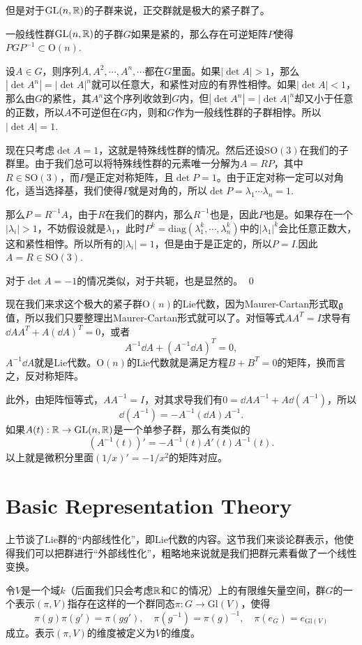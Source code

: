 但是对于$\mathrm{GL}(n,\mathbb{R})$的子群来说，正交群就是极大的紧子群了。

\pro 一般线性群$\mathrm{GL}(n,\mathbb{R})$的子群$G$如果是紧的，那么存在可逆矩阵$P$使得$PGP^{-1}\subset \mathrm{O}(n)$.

\proof 设$A\in G$，则序列$A,A^2,\cdots,A^n,\cdots$都在$G$里面。如果$|\det A|>1$，那么$|\det A^n|=|\det A|^n$就可以任意大，和紧性对应的有界性相悖。如果$|\det A|<1$，那么由$G$的紧性，其$A^n$这个序列收敛到$G$内，但$|\det A^n|=|\det A|^n$却又小于任意的正数，所以$A$不可逆但在$G$内，则和$G$作为一般线性群的子群相悖。所以$|\det A|=1$.

现在只考虑$\det A=1$，这就是特殊线性群的情况。然后还设$\mathrm{SO}(3)$在我们的子群里。由于我们总可以将特殊线性群的元素唯一分解为$A=RP$，其中$R\in \mathrm{SO}(3)$，而$P$是正定对称矩阵，且$\det P=1$。由于正定对称一定可以对角化，适当选择基，我们使得$P$就是对角的，所以$\det P=\lambda_1\cdots\lambda_n=1$.

那么$P=R^{-1}A$，由于$R$在我们的群内，那么$R^{-1}$也是，因此$P$也是。如果存在一个$|\lambda_i|>1$，不妨假设就是$\lambda_1$，此时$P^{k}=\mathrm{diag}(\lambda_1^k,\cdots,\lambda_n^k)$中的$|\lambda_1|^k$会比任意正数大，这和紧性相悖。所以所有的$|\lambda_i|=1$，但是由于是正定的，所以$P=I$.因此$A=R\in\mathrm{SO}(3)$.

对于$\det A=-1$的情况类似，对于共轭，也是显然的。 \qed

现在我们来求这个极大的紧子群$\mathrm{O}(n)$的Lie代数，因为Maurer-Cartan形式取${\mathfrak{g}}$值，所以我们只要整理出Maurer-Cartan形式就可以了。对恒等式$AA^T=I$求导有$\dd A A^T+A(\dd A)^T=0$，或者
\[
	A^{-1}\dd A+(A^{-1}\dd A)^T=0,
\]
$A^{-1}\dd A$就是Lie代数。$\mathrm{O}(n)$的Lie代数就是满足方程$B+B^T=0$的矩阵，换而言之，反对称矩阵。

此外，由矩阵恒等式，$AA^{-1}=I$，对其求导我们有$0=\dd A A^{-1}+A\dd(A^{-1})$，所以
\[
	\dd(A^{-1})=-A^{-1}(\dd A) A^{-1}.
\]
如果$A(t):\mathbb{R} \to \mathrm{GL}(n,\mathbb{R})$是一个单参子群，那么有类似的
\[
	(A^{-1}(t))'=-A^{-1}(t)A'(t) A^{-1}(t).
\]
以上就是微积分里面$(1/x)'=-1/x^2$的矩阵对应。

\section{Basic Representation Theory}

上节谈了Lie群的“内部线性化”，即Lie代数的内容。这节我们来谈论群表示，他使得我们可以把群进行“外部线性化”，粗略地来说就是我们把群元素看做了一个线性变换。

\para 令$V$是一个域$k$（后面我们只会考虑$\mathbb{R}$和$\mathbb{C}$的情况）上的有限维矢量空间，群$G$的一个表示$(\pi, V)$指存在这样的一个群同态$\pi:G\rightarrow \mathrm{Gl}(V)$，使得
\[
	\pi(g)\pi(g')=\pi(gg'),\quad \pi(g^{-1})=\pi(g)^{-1},\quad \pi(e_G)=e_{\mathrm{Gl}(V)}
\]
成立。表示$(\pi, V)$的维度被定义为$V$的维度。

